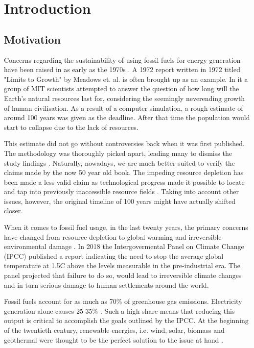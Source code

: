 \section{Introduction}


\subsection{Motivation}
  Concerns regarding the sustainability of using fossil fuels for energy generation
  have been raised in as early as the 1970s \cite{rethinking_resource_depletion}. 
  A 1972 report written in 1972 titled "Limits to Growth" by Meadows et. al.
  \cite{limits_to_growth} is often brought up as an example.
  In it a group of MIT scientists attempted to answer the question of
  how long will the Earth's natural resources last for,
  considering the seemingly neverending growth of human civilisation.
  As a result of a computer simulation,
  a rough estimate of around 100 years was given as the deadline.
  After that time the population would start to collapse due to the lack of resources.


  This estimate did not go without controversies back when it was first published.
  The methodology was thoroughly picked apart,
  leading many to dismiss the study findings
  \cite{rethinking_resource_depletion}.
  Naturally, nowadays, we are much better suited to verify
  the claims made by the now 50 year old book. The impeding resource depletion
  has been made a less valid claim as technological progress
  made it possible to locate and tap into
  previously inaccessible resource fields
  \cite{shaping_the_global_oil_peak}.
  Taking into account other issues, however, 
  the original timeline of 100 years might have
  actually shifted closer. 


  When it comes to fossil fuel usage, in the last twenty years, 
  the primary concerns have changed from resource depletion to global warming 
  and irreversible environmental damage \cite{rethinking_resource_depletion}.
  In 2018 the Intergovermental Panel on Climate Change (IPCC) published a
  report indicating the need to stop the average global temperature 
  at 1.5\degree C above the levels measurable in the pre-industrial era.
  The panel projected that failure to do so, would lead to irreversible climate changes
  and in turn serious damage to human settlements around the world.
  \cite{ipcc2018}


  Fossil fuels account for as much as 70\% of greenhouse gas emissions.
  Electricity generation alone causes 25-35\% 
  \cite{global_climate_change}.
  Such a high share means that reducing this output
  is critical to accomplish the goals outlined by the IPCC.
  At the beginning of the twentieth century, renewable energies, i.e. 
  wind, solar, biomass and geothermal were thought
  to be the perfect solution to the issue at hand
  \cite{renewable_review_2000}. 



